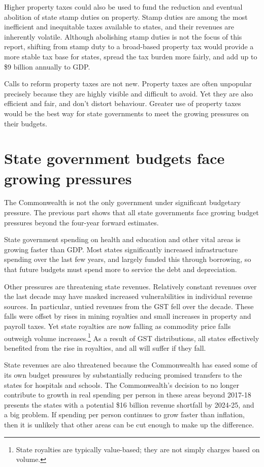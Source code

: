 \begin{overview}[-25pt]
Higher property taxes could also be used to fund the reduction and eventual abolition of state stamp duties on property. Stamp duties are among the most inefficient and inequitable taxes available to states, and their revenues are inherently volatile. Although abolishing stamp duties is not the focus of this report, shifting from stamp duty to a broad-based property tax would provide a more stable tax base for states, spread the tax burden more fairly, and add up to \$9 billion annually to GDP. 

Calls to reform property taxes are not new. Property taxes are often unpopular precisely because they are highly visible and difficult to avoid. Yet they are also efficient and fair, and don’t distort behaviour. Greater use of property taxes would be the best way for state governments to meet the growing pressures on their budgets.
\end{overview}
\chapter{State government budgets face growing pressures}\label{chapter:PROP-1}
The Commonwealth is not the only government under significant budgetary pressure. The previous part shows that all state governments face growing budget pressures beyond the four-year forward estimates. 

State government spending on health and education and other vital areas is growing faster than GDP\@. Most states significantly increased infrastructure spending over the last few years, and largely funded this through borrowing, so that future budgets must spend more to service the debt and depreciation. 

Other pressures are threatening state revenues. Relatively constant revenues over the last decade may have masked increased vulnerabilities in individual revenue sources. In particular, untied revenues from the GST fell over the decade.  These falls were offset by rises in mining royalties and small increases in property and payroll taxes. Yet state royalties are now falling as commodity price falls outweigh volume increases.\footnote{State royalties are typically value-based; they are not simply charges based on volume.}  As a result of GST distributions, all states effectively benefited from the rise in royalties, and all will suffer if they fall. 

State revenues are also threatened because the Commonwealth has eased some of its own budget pressures by substantially reducing promised transfers to the states for hospitals and schools. The Commonwealth’s decision to no longer contribute to growth in real spending per person in these areas beyond 2017-18 presents the states with a potential \$16 billion revenue shortfall by 2024-25, and a big problem.  If spending per person continues to grow faster than inflation, then it is unlikely that other areas can be cut enough to make up the difference. 

